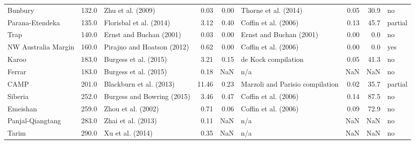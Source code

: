 \begin{tabular}{lrlrrlrrl}
             Bunbury &  132.0 &             Zhu et al. (2009) &               0.03 &              0.00 &                           Thorne et al. (2014) &              0.05 &       30.9 &       no \\
     Parana-Etendeka &  135.0 &       Florisbal et al. (2014) &               3.12 &              0.40 &                           Coffin et al. (2006) &              0.13 &       45.7 &  partial \\
                Trap &  140.0 &       Ernst and Buchan (2001) &               0.03 &              0.00 &                        Ernst and Buchan (2001) &              0.00 &        0.0 &       no \\
 NW Australia Margin &  160.0 &    Pirajno and Hoatson (2012) &               0.62 &              0.00 &                           Coffin et al. (2006) &              0.00 &        0.0 &      yes \\
               Karoo &  183.0 &         Burgess et al. (2015) &               3.21 &              0.15 &                            de Kock compilation &              0.05 &       41.3 &       no \\
              Ferrar &  183.0 &         Burgess et al. (2015) &               0.18 &               NaN &                                            n/a &               NaN &        NaN &       no \\
                CAMP &  201.0 &       Blackburn et al. (2013) &              11.46 &              0.23 &                Marzoli and Parisio compilation &              0.02 &       35.7 &  partial \\
             Siberia &  252.0 &    Burgess and Bowring (2015) &               3.46 &              0.47 &                           Coffin et al. (2006) &              0.14 &       87.5 &       no \\
            Emeishan &  259.0 &            Zhou et al. (2002) &               0.71 &              0.06 &                           Coffin et al. (2006) &              0.09 &       72.9 &       no \\
    Panjal-Qiangtang &  283.0 &            Zhai et al. (2013) &               0.11 &               NaN &                                            n/a &               NaN &        NaN &       no \\
               Tarim &  290.0 &              Xu et al. (2014) &               0.35 &               NaN &                                            n/a &               NaN &        NaN &       no \\

\end{tabular}

